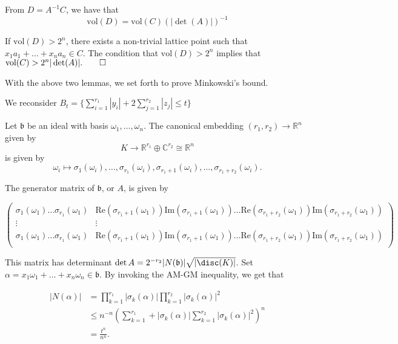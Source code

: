 \documentclass[a4paper, 12pt,oneside,openany]{book}
\begin{document}
From $D=A^{-1}C$, we have that $$\text{vol}(D) = \text{vol}(C)(|\det(A)|)^{-1}$$

If $\text{vol}(D) > 2^n$, there exists a non-trivial lattice point such that $x_1a_1+\dots+x_na_n \in C.$ The condition that $\text{vol}(D) > 2^n$ implies that $\text{vol}(C) > 2^n |\det(A)|. \qed$

With the above two lemmas, we set forth to prove Minkowski's bound. 

We reconsider $B_t = \Bigg\{\sum\limits_{i=1}^{r_1} |y_i| + 2 \sum\limits_{j=1}^{r_2} |z_j| \leq t\Bigg\}$

Let $\mathfrak{b}$ be an ideal with basis $\omega_1, \dots, \omega_n.$ The canonical embedding $(r_1, r_2) \to \mathbb{R}^n$ given by $$K \to \mathbb{R}^{r_1} \oplus \mathbb{C}^{r_2} \cong \mathbb{R}^n$$ is given by $$\omega_i \mapsto \sigma_1(\omega_i), \dots, \sigma_{r_1}(\omega_i), \sigma_{r_1+1}(\omega_i), \dots, \sigma_{r_1+r_2}(\omega_i).$$

The generator matrix of $\mathfrak{b}$, or $A$, is given by 

$$\begin{pmatrix}
\sigma_1(\omega_1) \dots \sigma_{r_1}(\omega_1) & \text{Re}(\sigma_{r_1+1}(\omega_1))\text{Im}(\sigma_{r_1+1}(\omega_1)) \dots \text{Re}(\sigma_{r_1+r_2}(\omega_1))\text{Im}(\sigma_{r_1+r_2}(\omega_1)) \\

\vdots & \vdots \\

\sigma_1(\omega_1) \dots \sigma_{r_1}(\omega_1) & \text{Re}(\sigma_{r_1+1}(\omega_1))\text{Im}(\sigma_{r_1+1}(\omega_1)) \dots \text{Re}(\sigma_{r_1+r_2}(\omega_1))\text{Im}(\sigma_{r_1+r_2}(\omega_1))\\

\end{pmatrix}$$

This matrix has determinant $\det A = 2^{-r_2}|N(\mathfrak{b})|\sqrt{|\disc(K)|}$. Set $\alpha = x_1\omega_1+\dots+x_n\omega_n \in \mathfrak{b}.$ By invoking the AM-GM inequality, we get that

\begin{align*}
|N(\alpha)|&=\prod\limits_{k=1}^{r_1} |\sigma_k(\alpha)|\prod\limits_{k=1}^{r_2}|\sigma_k(\alpha)|^2 \\
&\leq n^{-n} \left(\sum\limits_{k=1}^{r_1} +|\sigma_k(\alpha)|\sum\limits_{k=1}^{r_2}|\sigma_k(\alpha)|^2\right)^n\\
&=\frac{t^n}{n^n}.
\end{align*}
\end{document}
